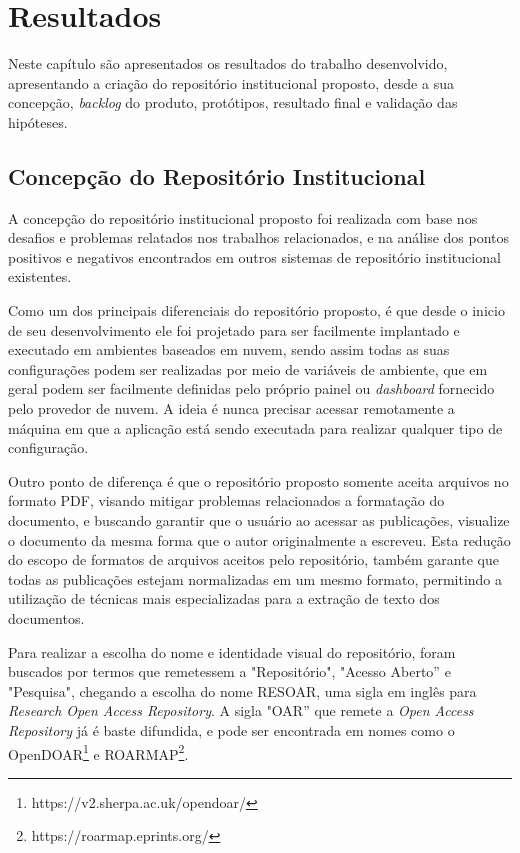 \chapter{Resultados}\label{chap:Results}

Neste capítulo são apresentados os resultados do trabalho desenvolvido,
apresentando a criação do repositório institucional proposto, desde a
sua concepção, \emph{backlog} do produto, protótipos, resultado final
e validação das hipóteses.

\section{Concepção do Repositório Institucional}

A concepção do repositório institucional proposto foi realizada com base
nos desafios e problemas relatados nos trabalhos relacionados, e na análise
dos pontos positivos e negativos encontrados em outros sistemas de repositório
institucional existentes.

Como um dos principais diferenciais do repositório proposto, é que desde o
inicio de seu desenvolvimento ele foi projetado para ser facilmente implantado
e executado em ambientes baseados em nuvem, sendo assim todas as suas configurações
podem ser realizadas por meio de variáveis de ambiente, que em geral podem ser
facilmente definidas pelo próprio painel ou \emph{dashboard} fornecido pelo
provedor de nuvem. A ideia é nunca precisar acessar remotamente a máquina
em que a aplicação está sendo executada para realizar qualquer tipo de configuração.

Outro ponto de diferença é que o repositório proposto somente aceita arquivos no
formato PDF, visando mitigar problemas relacionados a formatação do documento, e
buscando garantir que o usuário ao acessar as publicações, visualize
o documento da mesma forma que o autor originalmente a escreveu. Esta redução
do escopo de formatos de arquivos aceitos pelo repositório, também garante que
todas as publicações estejam normalizadas em um mesmo formato, permitindo a
utilização de técnicas mais especializadas para a extração de texto dos documentos.

Para realizar a escolha do nome e identidade visual do repositório, foram buscados
por termos que remetessem a "Repositório", "Acesso Aberto'' e "Pesquisa", chegando
a escolha do nome RESOAR, uma sigla em inglês para \emph{Research Open Access Repository}.
A sigla "OAR'' que remete a \emph{Open Access Repository} já é baste difundida, e
pode ser encontrada em nomes como o OpenDOAR\footnote{https://v2.sherpa.ac.uk/opendoar/} e
ROARMAP\footnote{https://roarmap.eprints.org/}.

